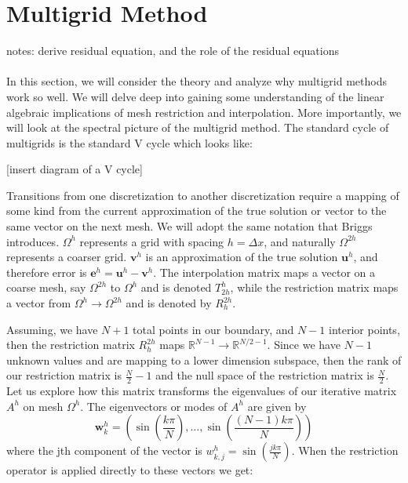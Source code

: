 \documentclass[pdftex,12pt,a4paper]{article}
\begin{document}
\section{Multigrid Method}

notes: 
derive residual equation, and the role of the residual equations



\paragraph{} In this section, we will consider the theory and analyze why multigrid methods work so well.  We will delve deep into gaining some understanding of the linear algebraic implications of mesh restriction and interpolation.  More importantly, we will look at the spectral picture of the multigrid method.  The standard cycle of multigrids is the standard V cycle which looks like: 

[insert diagram of a V cycle]

Transitions from one discretization to another discretization require a mapping of some kind from the current approximation of the true solution or vector to the same vector on the next mesh.  We will adopt the same notation that Briggs introduces. $\Omega^{h}$ represents a grid with spacing $h = \Delta x $, and naturally $\Omega^{2h}$ represents a coarser grid.   $\mathbf{v}^h$ is an approximation of the true solution $\mathbf{u}^h$, and therefore error is $\mathbf{e}^h = \mathbf{u}^h - \mathbf{v}^h$.  The interpolation matrix maps a vector on a coarse mesh, say $\Omega^{2h}$ to $\Omega^{h}$ and is denoted $T_{2h}^h$, while the restriction matrix maps a vector from $\Omega^{h} \rightarrow \Omega^{2h}$ and is denoted by $R_h^{2h}$.  

Assuming, we have $N+1$ total points in our boundary, and $N-1$ interior points, then the restriction matrix $R_h^{2h}$ maps $\mathbb{R}^{N-1} \rightarrow \mathbb{R}^{N/2 -1}$.  Since we have $N-1$ unknown values and are mapping to a lower dimension subspace, then the rank of our restriction matrix is $\frac{N}{2} -1 $ and the null space of the restriction matrix is $\frac{N}{2}$.  Let us explore how this matrix transforms the eigenvalues of our iterative matrix $A^h$ on mesh $\Omega^h$.  The eigenvectors or modes of $A^h$ are given by 
$$\mathbf{w}_{k}^h = \left( \sin\left( \frac{k \pi}{N}\right), \dots, \sin\left( \frac{(N-1)k \pi}{N}\right) \right)$$ where the jth component of the vector is $w_{k,j}^h = \sin\left( \frac{jk \pi}{N}\right)$.  When the restriction operator is applied directly to these vectors we get: 
\end{document}
